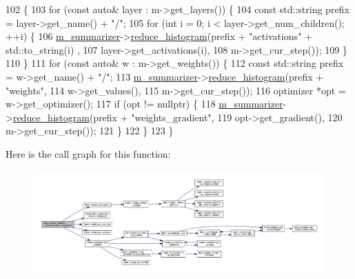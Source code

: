 \begin{DoxyCode}
102                                                      \{
103   \textcolor{keywordflow}{for} (\textcolor{keyword}{const} \textcolor{keyword}{auto}& layer : m->get\_layers()) \{
104     \textcolor{keyword}{const} std::string prefix = layer->get\_name() + \textcolor{stringliteral}{"/"};
105     \textcolor{keywordflow}{for} (\textcolor{keywordtype}{int} i = 0; i < layer->get\_num\_children(); ++i) \{
106       \hyperlink{classlbann_1_1lbann__callback_a277d46138184f85f161a8263b8322c76}{m\_summarizer}->\hyperlink{classlbann_1_1lbann__summary_a6303fa270a3b7179f361b47418f812ef}{reduce\_histogram}(prefix + \textcolor{stringliteral}{"activations"} + std::to\_string(i)
      ,
107                                      layer->get\_activations(i),
108                                      m->get\_cur\_step());
109     \}
110   \}
111   \textcolor{keywordflow}{for} (\textcolor{keyword}{const} \textcolor{keyword}{auto}& w : m->get\_weights()) \{
112     \textcolor{keyword}{const} std::string prefix = w->get\_name() + \textcolor{stringliteral}{"/"};
113     \hyperlink{classlbann_1_1lbann__callback_a277d46138184f85f161a8263b8322c76}{m\_summarizer}->\hyperlink{classlbann_1_1lbann__summary_a6303fa270a3b7179f361b47418f812ef}{reduce\_histogram}(prefix + \textcolor{stringliteral}{"weights"},
114                                    w->get\_values(),
115                                    m->get\_cur\_step());
116     optimizer *opt = w->get\_optimizer();
117     \textcolor{keywordflow}{if} (opt != \textcolor{keyword}{nullptr}) \{
118       \hyperlink{classlbann_1_1lbann__callback_a277d46138184f85f161a8263b8322c76}{m\_summarizer}->\hyperlink{classlbann_1_1lbann__summary_a6303fa270a3b7179f361b47418f812ef}{reduce\_histogram}(prefix + \textcolor{stringliteral}{"weights\_gradient"},
119                                      opt->get\_gradient(),
120                                      m->get\_cur\_step());
121     \}
122   \}
123 \}
\end{DoxyCode}
Here is the call graph for this function\+:\nopagebreak
\begin{figure}[H]
\begin{center}
\leavevmode
\includegraphics[width=350pt]{classlbann_1_1lbann__callback__summary_a72a46c51527a02516584ce1e49e5cd29_cgraph}
\end{center}
\end{figure}
